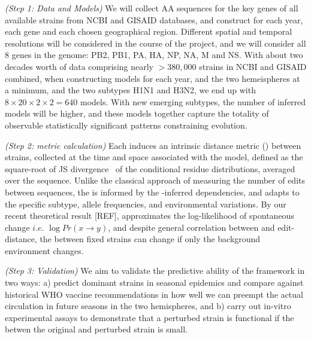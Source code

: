 \documentclass[onecolumn, compsoc,12pt]{IEEEtran}
\def\SUPPLEMENTARY{Supplementary\xspace}
\def\METHODS{Online Methods\xspace}
\begin{document}
\textit{(Step 1: Data and \enet Models)} We will collect AA sequences for the key genes of all available strains from NCBI and GISAID databases, and construct  for each year,  each gene and each chosen geographical region. Different spatial and temporal resolutions will be considered in the course of the project, and we will consider all 8 genes in the \infl genome: PB2, PB1, PA, HA, NP, NA, M and NS. With about two decades worth of data comprising nearly $>380,000$ strains in NCBI and GISAID combined, when constructing models for each year, and the two hemeispheres at a minimum, and the two subtypes H1N1 and H3N2, we end up with  $ 8 \times 20 \times 2 \times 2 = 640$ \enet models. With new emerging subtypes, the number of inferred models will be higher, and these models together capture the totality of observable statistically significant patterns constraining \infl evolution. 

\textit{(Step 2: \qdist metric calculation)} Each  \enet induces  an intrinsic distance metric (\qdist) between strains, collected at the time and space associated with the model, defined as the square-root of JS  divergence~\cite{cover} of the conditional residue distributions, averaged over the sequence. Unlike the classical approach of measuring the number of edits between sequences, the \qdist is informed by the \enet-inferred  dependencies, and adapts to the specific subtype, allele frequencies, and environmental variations. By our recent theoretical result [REF],  \qdist  approximates the log-likelihood of spontaneous change $i.e.$ $\log Pr(x \rightarrow y )$, and despite general correlation between \qdist and edit-distance, the \qdist between fixed strains can change if only the background environment changes.  %

\textit{(Step 3: Validation)} We aim to validate the predictive ability of the \enet framework in two ways: a) predict dominant strains in seasonal epidemics and compare against historical WHO vaccine recommendations in how well we can preempt the actual circulation in future seasons in the two hemispheres, and b) carry out in-vitro experimental assays to demonstrate that a perturbed strain is functional if the \qdist betwen the original and perturbed strain is small. 
\end{document}
